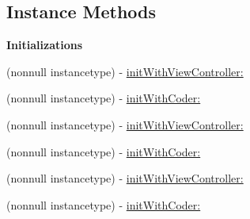 \subsection*{Instance Methods}
\begin{Indent}\textbf{ Initializations}\par
{\em 

 

 }\begin{DoxyCompactItemize}
\item 
(nonnull instancetype) -\/ \mbox{\hyperlink{interface_i_q_keyboard_return_key_handler_a29037f92d4d7f1509f677fb0e998754a}{init\+With\+View\+Controller\+:}}
\item 
(nonnull instancetype) -\/ \mbox{\hyperlink{interface_i_q_keyboard_return_key_handler_aba05c4f519d0eeda78568a2ba1baeca7}{init\+With\+Coder\+:}}
\item 
(nonnull instancetype) -\/ \mbox{\hyperlink{interface_i_q_keyboard_return_key_handler_a29037f92d4d7f1509f677fb0e998754a}{init\+With\+View\+Controller\+:}}
\item 
(nonnull instancetype) -\/ \mbox{\hyperlink{interface_i_q_keyboard_return_key_handler_aba05c4f519d0eeda78568a2ba1baeca7}{init\+With\+Coder\+:}}
\item 
(nonnull instancetype) -\/ \mbox{\hyperlink{interface_i_q_keyboard_return_key_handler_a29037f92d4d7f1509f677fb0e998754a}{init\+With\+View\+Controller\+:}}
\item 
(nonnull instancetype) -\/ \mbox{\hyperlink{interface_i_q_keyboard_return_key_handler_aba05c4f519d0eeda78568a2ba1baeca7}{init\+With\+Coder\+:}}
\end{DoxyCompactItemize}
\end{Indent}
